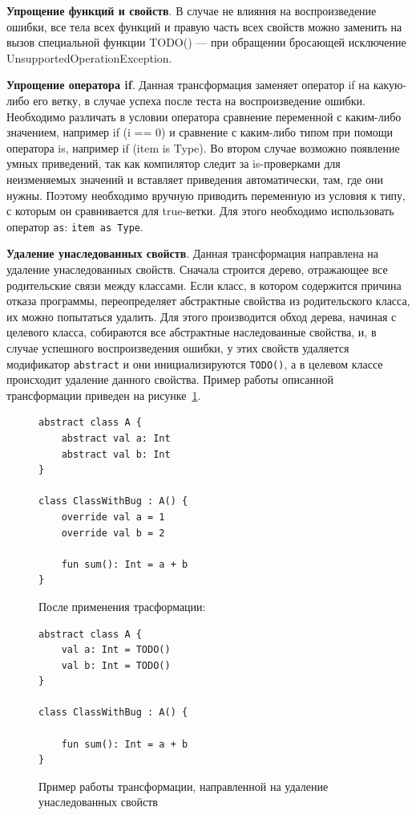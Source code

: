 \textbf{Упрощение функций и свойств}. В случае не влияния на воспроизведение ошибки, все тела всех функций и правую часть всех свойств можно заменить на вызов специальной функции TODO() --- при обращении бросающей исключение UnsupportedOperationException.

\textbf{Упрощение оператора if}. Данная трансформация заменяет оператор if на какую-либо его ветку, в случае успеха после теста на воспроизведение ошибки. Необходимо различать в условии оператора сравнение переменной с каким-либо значением, например if (i == 0) и сравнение с каким-либо типом при помощи оператора is, например if (item is Type). Во втором случае возможно появление умных приведений, так как компилятор следит за is-проверками для неизменяемых значений и вставляет приведения автоматически, там, где они нужны. Поэтому необходимо вручную приводить переменную из условия к типу, с которым он сравнивается для true-ветки. Для этого необходимо использовать оператор \texttt{as}: \texttt{item as Type}.

\textbf{Удаление унаследованных свойств}. Данная трансформация направлена на удаление унаследованных свойств. Сначала строится дерево, отражающее все родительские связи между классами. Если класс, в котором содержится причина отказа программы, переопределяет абстрактные свойства из родительского класса, их можно попытаться удалить. Для этого производится обход дерева, начиная с целевого класса, собираются все абстрактные наследованные свойства, и, в случае успешного воспроизведения ошибки, у этих свойств удаляется модификатор \texttt{abstract} и они инициализируются \texttt{TODO()}, а в целевом классе происходит удаление данного свойства. Пример работы описанной трансформации приведен на рисунке~\ref{ex:prop}. 
\begin{figure}
\begin{lstlisting}
abstract class A {
    abstract val a: Int
    abstract val b: Int
}

class ClassWithBug : A() {
    override val a = 1
    override val b = 2
    
    fun sum(): Int = a + b
}
\end{lstlisting}
После применения трасформации:
\begin{lstlisting}
abstract class A {
    val a: Int = TODO()
    val b: Int = TODO()
}

class ClassWithBug : A() {

    fun sum(): Int = a + b
}
\end{lstlisting}
\caption{\label{ex:prop}Пример работы трансформации, направленной на удаление унаследованных свойств}
\end{figure}


